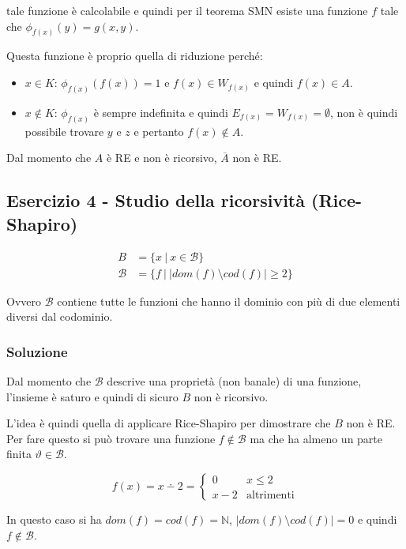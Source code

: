 tale funzione è calcolabile e quindi per il teorema SMN esiste una funzione $f$ tale che $\phi_{f(x)}(y) = g(x,y)$.

Questa funzione è proprio quella di riduzione perché:

\begin{itemize}
	\item $x \in K$: $\phi_{f(x)}(f(x)) = 1$ e $f(x) \in W_{f(x)}$ e quindi $f(x) \in A$.
	\item $x \notin K$: $\phi_{f(x)}$ è sempre indefinita e quindi $E_{f(x)} = W_{f(x)} = \emptyset$, non è quindi possibile trovare $y$ e $z$ e pertanto $f(x) \notin A$.
\end{itemize}

Dal momento che $A$ è RE e non è ricorsivo, $\overline{A}$ non è RE.

\subsection{Esercizio 4 - Studio della ricorsività (Rice-Shapiro)}

\begin{align*}
	B &= \{ x \:| \: x \in \mathcal{B} \} \\
	\mathcal{B} &= \{ f \: |\: |dom(f) \setminus cod(f) | \geq 2 \}
\end{align*}

Ovvero $\mathcal{B}$ contiene tutte le funzioni che hanno il dominio con più di due elementi diversi dal codominio.

\subsubsection{Soluzione}

Dal momento che $\mathcal{B}$ descrive una proprietà (non banale) di una funzione, l'insieme è saturo e quindi di sicuro $B$ non è ricorsivo.

L'idea è quindi quella di applicare Rice-Shapiro per dimostrare che $B$ non è RE. Per fare questo si può trovare una funzione $f \notin \mathcal{B}$ ma che ha almeno un parte finita $\vartheta \in \mathcal{B}$.

$$
f(x) = x \dotminus 2 = \begin{cases}
0 &x \leq 2 \\
x -2 &\text{altrimenti}
\end{cases}
$$

In questo caso si ha $dom(f) = cod(f) = \mathbb{N}$, $| dom(f) \setminus cod(f)| = 0$ e quindi $f \notin \mathcal{B}$.


